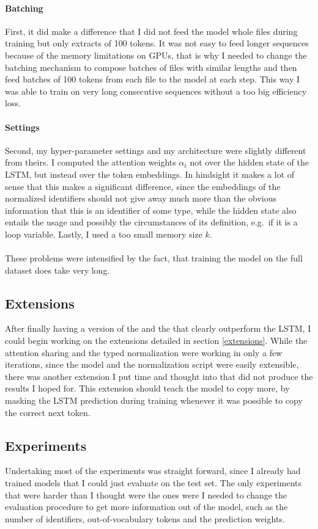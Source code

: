 \documentclass[11pt]{article}
\begin{document}
\paragraph{Batching} First, it did make a difference that I did not feed the model whole files during training but only extracts of 100 tokens. It was not easy to feed longer sequences because of the memory limitations on GPUs, that is why I needed to change the batching mechanism to compose batches of files with similar lengths and then feed batches of 100 tokens from each file to the model at each step. This way I was able to train on very long consecutive sequences without a too big efficiency loss.
\paragraph{Settings} Second, my hyper-parameter settings and my architecture were slightly different from theirs. I computed the attention weights $\alpha_t$ not over the hidden state of the LSTM, but instead over the token embeddings. In hindsight it makes a lot of sense that this makes a significant difference, since the embeddings of the normalized identifiers should not give away much more than the obvious information that this is an identifier of some type, while the hidden state also entails the usage and possibly the circumstances of its definition, e.g.\ if it is a loop variable. Lastly, I used a too small memory size $k$.
\\\\
These problems were intensified by the fact, that training the model on the full dataset does take very long.
\subsection{Extensions}
After finally having a version of the \spn and the \lmatt that clearly outperform the LSTM, I could begin working on the extensions detailed in section \ref{extensions}. While the attention sharing and the typed normalization were working in only a few iterations, since the model and the normalization script were easily extensible, there was another extension I put time and thought into that did not produce the results I hoped for. This extension should teach the model to copy more, by masking the LSTM prediction during training whenever it was possible to copy the correct next token.

\subsection{Experiments}
Undertaking most of the experiments was straight forward, since I already had trained models that I could just evaluate on the test set. The only experiments that were harder than I thought were the ones were I needed to change the evaluation procedure to get more information out of the model, such as the number of identifiers, out-of-vocabulary tokens and the prediction weights.
\end{document}
